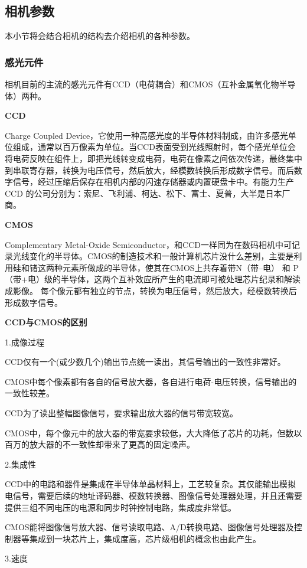 \subsection{相机参数}
本小节将会结合相机的结构去介绍相机的各种参数。
\subsubsection{感光元件}
相机目前的主流的感光元件有CCD（电荷耦合）和CMOS（互补金属氧化物半导体）两种。

\textbf{CCD}

Charge Coupled Device，它使用一种高感光度的半导体材料制成，由许多感光单位组成，通常以百万像素为单位。当CCD表面受到光线照射时，每个感光单位会将电荷反映在组件上，即把光线转变成电荷，电荷在像素之间依次传递，最终集中到串联寄存器，转换为电压信号，然后放大，经模数转换后形成数字信号。而后数字信号，经过压缩后保存在相机内部的闪速存储器或内置硬盘卡中。有能力生产CCD 的公司分别为：索尼、飞利浦、柯达、松下、富士、夏普，大半是日本厂商。

\textbf{CMOS}

Complementary Metal-Oxide Semiconductor，和CCD一样同为在数码相机中可记录光线变化的半导体。CMOS的制造技术和一般计算机芯片没什么差别，主要是利用硅和锗这两种元素所做成的半导体，使其在CMOS上共存着带N（带–电） 和 P（带+电）级的半导体，这两个互补效应所产生的电流即可被处理芯片纪录和解读成影像。
每个像元都有独立的节点，转换为电压信号，然后放大，经模数转换后形成数字信号。

\textbf{CCD与CMOS的区别}

1.成像过程

CCD仅有一个(或少数几个)输出节点统一读出，其信号输出的一致性非常好。

CMOS中每个像素都有各自的信号放大器，各自进行电荷-电压转换，信号输出的一致性较差。

CCD为了读出整幅图像信号，要求输出放大器的信号带宽较宽。

CMOS中，每个像元中的放大器的带宽要求较低，大大降低了芯片的功耗，但数以百万的放大器的不一致性却带来了更高的固定噪声。

2.集成性

CCD中的电路和器件是集成在半导体单晶材料上，工艺较复杂。其仅能输出模拟电信号，需要后续的地址译码器、模数转换器、图像信号处理器处理，并且还需要提供三组不同电压的电源和同步时钟控制电路，集成度非常低。

CMOS能将图像信号放大器、信号读取电路、A/D转换电路、图像信号处理器及控制器等集成到一块芯片上，集成度高，芯片级相机的概念也由此产生。

3.速度

